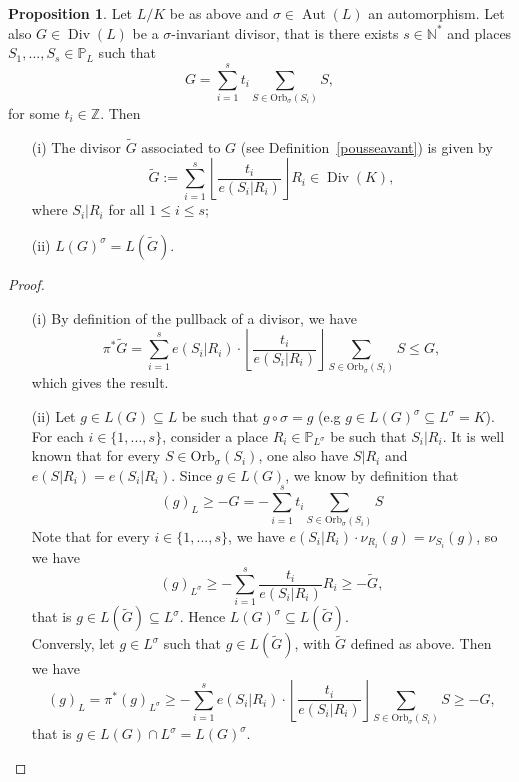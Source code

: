 \documentclass[10pt]{article}
\theoremstyle{definition}
\newtheorem{prop1}[thm]{Proposition}
\theoremstyle{definition}
\theoremstyle{definition}
\newcommand{\s}{\vspace{0.3cm}}
\newcommand{\cd}{\cdot}
\newcommand{\N}{\mathbb{N}}
\newcommand{\Z}{\mathbb{Z}}
\newcommand{\PP}{\mathbb{P}}
\newcommand{\su}{\subseteq}
\newcommand{\Div}{\operatorname{Div}}
\newcommand{\Aut}{\operatorname{Aut}}
\begin{document}
\s

\begin{prop1} \label{invrr}
Let $L/K$ be as above and $\sigma \in \Aut(L)$ an automorphism. Let also $G \in \Div(L)$ be a $\sigma$-invariant divisor, that is there exists $s \in \N^*$ and places $S_1,...,S_s \in \PP_L$ such that 
\[G = \sum\limits_{i=1}^s t_i \sum\limits_{S \in \mathrm{Orb}_{\sigma}(S_i)} S,\]
for some $t_i \in \Z$. Then
\begin{itemize}
\item[(i)] The divisor $\tilde{G}$ associated to $G$ (see Definition~\ref{pousseavant}) is given by
\[\tilde{G}:= \sum\limits_{i=1}^s \left\lfloor\dfrac{t_i}{e(S_i|R_i)}\right\rfloor  R_i \in \Div(K),\]
where $S_i|R_i$ for all $1 \leq i \leq s$;
\item[(ii)]  $L(G)^{\sigma} = L(\tilde{G})$.
\end{itemize}
\end{prop1}

\s

\begin{proof}
\begin{itemize}
\item[(i)] By definition of the pullback of a divisor, we have
\[\pi^*\tilde{G} = \sum\limits_{i=1}^s e(S_i|R_i) \cd \left\lfloor\dfrac{t_i}{e(S_i|R_i)}\right\rfloor \sum\limits_{S \in \mathrm{Orb}_{\sigma}(S_i)} S \leq G,\]
which gives the result. 
\item[(ii)] Let $g \in L(G) \su L$ be such that $g \circ \sigma = g$ (e.g $g \in L(G)^{\sigma} \su L^{\sigma}=K$). For each $i \in \{1,...,s\}$, consider a place $R_i \in \PP_{L^{\sigma}}$ be such that $S_i|R_i$. It is well known that for every $S \in \mathrm{Orb}_{\sigma}(S_i)$, one also have $S|R_i$ and $e(S|R_i)=e(S_i|R_i)$. Since $g \in L(G)$, we know by definition that
\[(g)_L \geq -G=- \sum\limits_{i=1}^s t_i \sum\limits_{S \in \mathrm{Orb}_{\sigma}(S_i)} S\]
Note that for every $i \in \{1,...,s\}$, we have $e(S_i|R_i) \cd \nu_{R_i}(g) = \nu_{S_i}(g)$, so we have 
\[(g)_{L^{\sigma}} \geq - \sum\limits_{i=1}^s \dfrac{t_i}{e(S_i|R_i)}  R_i \geq - \tilde{G},\]
that is $g \in L(\tilde{G}) \su L^{\sigma}$. Hence $L(G)^{\sigma} \su L(\tilde{G})$. \\
Conversly, let $g \in L^{\sigma}$ such that $g \in L(\tilde{G})$, with $\tilde{G}$ defined as above. Then we have 
\[ (g)_L = \pi^*(g)_{L^{\sigma}} \geq -\sum\limits_{i=1}^s e(S_i|R_i) \cd \left\lfloor\dfrac{t_i}{e(S_i|R_i)}\right\rfloor \sum\limits_{S \in \mathrm{Orb}_{\sigma}(S_i)} S \geq -G,\]
that is $g \in L(G) \cap L^{\sigma} = L(G)^{\sigma}$.
\end{itemize}
\end{proof}
\color{black}
\s
\end{document}
